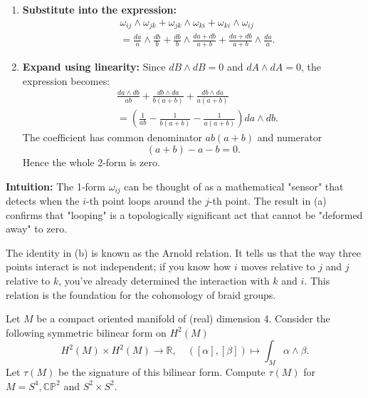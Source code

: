 \begin{solution}
\begin{enumerate}
    \item \textbf{Substitute into the expression:} 
    \[
    \begin{aligned}
        &\omega_{ij}\wedge\omega_{jk}
        +\omega_{jk}\wedge\omega_{ki}
        +\omega_{ki}\wedge\omega_{ij} \\
        &=
        \frac{da}{a}\wedge\frac{db}{b}
        +
        \frac{db}{b}\wedge\frac{da+db}{a+b}
        +
        \frac{da+db}{a+b}\wedge\frac{da}{a}.
    \end{aligned}
    \]
    
    \item \textbf{Expand using linearity:} Since $dB \wedge dB = 0$ and $dA \wedge dA = 0$, the expression becomes:
    \[
    \begin{aligned}
        &\frac{da\wedge db}{ab}
        +
        \frac{db\wedge da}{b(a+b)}
        +
        \frac{db\wedge da}{a(a+b)} \\
        &=
        \left(
            \frac{1}{ab}
            -
            \frac{1}{b(a+b)}
            -
            \frac{1}{a(a+b)}
        \right)da\wedge db.
    \end{aligned}
    \]
    The coefficient has common denominator $ab(a+b)$ and numerator
    \[
        (a+b)-a-b=0.
    \]
    Hence the whole 2-form is zero.
\end{enumerate}

\medskip
\textbf{Intuition:}
The 1-form $\omega_{ij}$ can be thought of as a mathematical "sensor" that detects when the $i$-th point loops around the $j$-th point. The result in (a) confirms that "looping" is a topologically significant act that cannot be "deformed away" to zero.

\medskip
The identity in (b) is known as the Arnold relation. It tells us that the way three points interact is not independent; if you know how $i$ moves relative to $j$ and $j$ relative to $k$, you've already determined the interaction with $k$ and $i$. This relation is the foundation for the cohomology of braid groups.
\end{solution}

\begin{exercise}
\label{geometry:2019:2}
Let $M$ be a compact oriented manifold of (real) dimension 4. Consider the following symmetric bilinear form on $H^{2}(M)$
\[
H^{2}(M) \times H^{2}(M) \to \mathbb{R}, \quad ([\alpha], [\beta]) \mapsto \int_{M} \alpha \wedge \beta.
\]
Let $\tau(M)$ be the signature of this bilinear form. Compute $\tau(M)$ for $M = S^{4}, \mathbb{CP}^{2}$ and $S^{2} \times S^{2}$.
\end{exercise}

